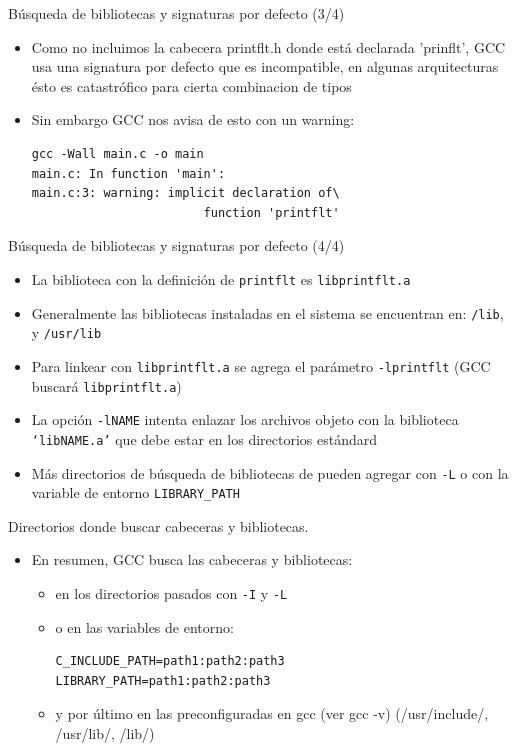 \documentclass[xetex]{beamer}
\begin{document}
\begin{frame}[fragile]{Búsqueda de bibliotecas y signaturas por defecto (3/4)}
  

\begin{itemize}
  \item Como no incluimos la cabecera printflt.h donde está declarada 'prinflt', GCC usa
una signatura por defecto que es incompatible, en algunas arquitecturas
ésto es catastrófico para cierta combinacion de tipos
  \item Sin embargo GCC nos avisa de esto con un warning:
\begin{verbatim}
gcc -Wall main.c -o main
main.c: In function 'main':
main.c:3: warning: implicit declaration of\
                        function 'printflt'
\end{verbatim}

\end{itemize}
  
\end{frame}
\begin{frame}[fragile]{Búsqueda de bibliotecas y signaturas por defecto (4/4)}
\begin{itemize}
\item La biblioteca con la definición de \verb=printflt= es \verb=libprintflt.a= 
\item Generalmente las bibliotecas instaladas en el sistema se encuentran en: \verb=/lib=, y \verb=/usr/lib=
\item Para linkear con \verb=libprintflt.a= se agrega el parámetro \verb=-lprintflt= (GCC buscará \verb=libprintflt.a=)
\item La opción \verb=-lNAME= intenta enlazar los archivos objeto con la biblioteca \verb=‘libNAME.a’= que debe estar en los directorios estándard
\item Más directorios de búsqueda de bibliotecas de pueden agregar con \verb=-L= o con la variable de entorno \verb=LIBRARY_PATH=
\end{itemize}
\end{frame}

\begin{frame}[fragile]{Directorios donde buscar cabeceras y bibliotecas.}
\begin{itemize}
  \item En resumen, GCC busca las cabeceras y bibliotecas:
  \begin{itemize}
    \item en los directorios pasados con \verb=-I= y \verb=-L=
    \item o en las variables de entorno:
\begin{verbatim}
C_INCLUDE_PATH=path1:path2:path3
LIBRARY_PATH=path1:path2:path3
\end{verbatim}
  \item y por último en las preconfiguradas en gcc (ver gcc -v)
            (/usr/include/, /usr/lib/, /lib/)
  \end{itemize}
\end{itemize}
\end{frame}
\end{document}
